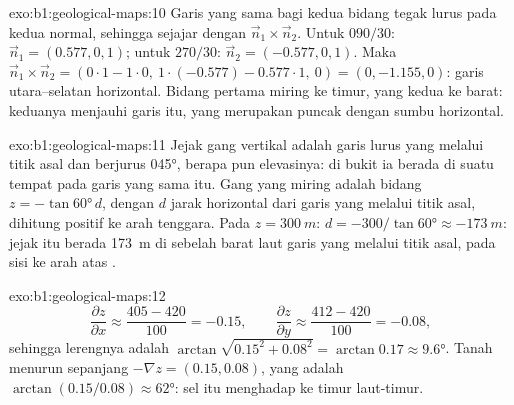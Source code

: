 \begin{solution}{exo:b1:geological-maps:10}
Garis yang sama bagi kedua bidang tegak lurus pada kedua normal, sehingga sejajar dengan $\vec n_1 \times \vec n_2$. Untuk $090/30$: $\vec n_1 = (0.577, 0,
1)$; untuk $270/30$: $\vec n_2 = (-0.577, 0, 1)$. Maka $\vec n_1 \times \vec n_2
= (0\cdot 1 - 1\cdot 0,\ 1\cdot(-0.577) - 0.577\cdot 1,\ 0) = (0, -1.155,
0)$: garis utara--selatan horizontal. Bidang pertama miring ke timur, yang kedua ke barat: keduanya menjauhi garis itu, yang merupakan puncak  dengan sumbu horizontal.
\end{solution}

\begin{solution}{exo:b1:geological-maps:11}
Jejak gang vertikal adalah garis lurus yang melalui titik asal dan berjurus \ang{045}, berapa pun elevasinya: di bukit ia berada di suatu tempat pada garis yang sama itu. Gang yang miring adalah bidang $z = -\tan\ang{60}\,d$, dengan $d$ jarak horizontal dari garis  yang melalui titik asal, dihitung positif ke arah tenggara. Pada $z = \qty{300}{m}$: $d = -300/\tan\ang{60}
\approx \qty{-173}{m}$: jejak itu berada \qty{173}{m} di sebelah barat laut garis  yang melalui titik asal, pada sisi ke arah atas .
\end{solution}

\begin{solution}{exo:b1:geological-maps:12}
\[
  \frac{\partial z}{\partial x} \approx \frac{405 - 420}{100} = -0.15, \qquad
  \frac{\partial z}{\partial y} \approx \frac{412 - 420}{100} = -0.08,
\]
sehingga  lerengnya adalah $\arctan\sqrt{0.15^2 + 0.08^2} = \arctan 0.17 \approx
\ang{9.6}$. Tanah menurun sepanjang $-\nabla z = (0.15, 0.08)$, yang 
adalah $\arctan(0.15/0.08) \approx \ang{62}$: sel itu menghadap ke timur laut-timur.
\end{solution}

